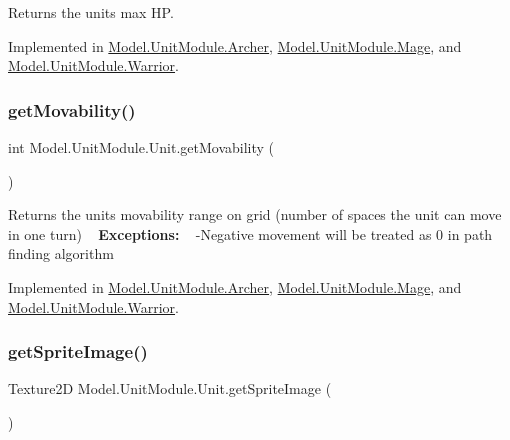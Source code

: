 Returns the unit\textquotesingle{}s max HP. 

Implemented in \hyperlink{class_model_1_1_unit_module_1_1_archer_abbb5c6501863bea35613df66a094b490}{Model.\+Unit\+Module.\+Archer}, \hyperlink{class_model_1_1_unit_module_1_1_mage_a3b3a869faa3d4014175b79c87d18c865}{Model.\+Unit\+Module.\+Mage}, and \hyperlink{class_model_1_1_unit_module_1_1_warrior_a1f8dded5d374af5e7e2f68a6977a19c3}{Model.\+Unit\+Module.\+Warrior}.

\hypertarget{interface_model_1_1_unit_module_1_1_unit_a670aae31f46980c871774352f5fe3a3f}{}\label{interface_model_1_1_unit_module_1_1_unit_a670aae31f46980c871774352f5fe3a3f} 
\subsubsection{\texorpdfstring{get\+Movability()}{getMovability()}}
{\footnotesize\ttfamily int Model.\+Unit\+Module.\+Unit.\+get\+Movability (\begin{DoxyParamCaption}{ }\end{DoxyParamCaption})}

Returns the unit\textquotesingle{}s movability range on grid (number of spaces the unit can move in one turn) ~\newline
{\bfseries Exceptions\+:} ~\newline
 -\/\+Negative movement will be treated as 0 in path finding algorithm 

Implemented in \hyperlink{class_model_1_1_unit_module_1_1_archer_a54970d1557f24e41507c5bd056ac1f03}{Model.\+Unit\+Module.\+Archer}, \hyperlink{class_model_1_1_unit_module_1_1_mage_a85e20ef350f937c14e6de3362c0cdcfb}{Model.\+Unit\+Module.\+Mage}, and \hyperlink{class_model_1_1_unit_module_1_1_warrior_a2c9d4bae73598731bd6378add6a377e7}{Model.\+Unit\+Module.\+Warrior}.

\hypertarget{interface_model_1_1_unit_module_1_1_unit_a797013e0463ea2e8c9ae8171f7d305f0}{}\label{interface_model_1_1_unit_module_1_1_unit_a797013e0463ea2e8c9ae8171f7d305f0} 
\subsubsection{\texorpdfstring{get\+Sprite\+Image()}{getSpriteImage()}}
{\footnotesize\ttfamily Texture2D Model.\+Unit\+Module.\+Unit.\+get\+Sprite\+Image (\begin{DoxyParamCaption}{ }\end{DoxyParamCaption})}

